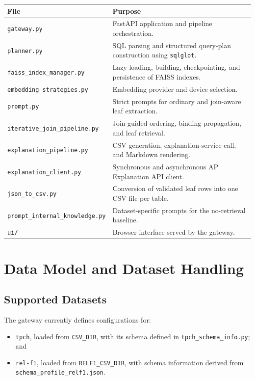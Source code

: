 \documentclass[11pt,a4paper]{article}
\newcommand{\code}[1]{\texttt{#1}}
\begin{document}
\begin{longtable}{>{\raggedright\arraybackslash}p{} >{\raggedright\arraybackslash}p{}}
\toprule
\textbf{File} & \textbf{Purpose} \\
\midrule
\endhead
\code{gateway.py} & FastAPI application and pipeline orchestration. \\
\code{planner.py} & SQL parsing and structured query-plan construction using \code{sqlglot}. \\
\code{faiss\_index\_manager.py} & Lazy loading, building, checkpointing, and persistence of FAISS indexes. \\
\code{embedding\_strategies.py} & Embedding provider and device selection. \\
\code{prompt.py} & Strict prompts for ordinary and join-aware leaf extraction. \\
\code{iterative\_join\_pipeline.py} & Join-guided ordering, binding propagation, and leaf retrieval. \\
\code{explanation\_pipeline.py} & CSV generation, explanation-service call, and Markdown rendering. \\
\code{explanation\_client.py} & Synchronous and asynchronous AP Explanation API client. \\
\code{json\_to\_csv.py} & Conversion of validated leaf rows into one CSV file per table. \\
\code{prompt\_internal\_knowledge.py} & Dataset-specific prompts for the no-retrieval baseline. \\
\code{ui/} & Browser interface served by the gateway. \\
\bottomrule
\end{longtable}

\section{Data Model and Dataset Handling}

\subsection{Supported Datasets}

The gateway currently defines configurations for:

\begin{itemize}
  \item \code{tpch}, loaded from \code{CSV\_DIR}, with its schema defined in
        \code{tpch\_schema\_info.py}; and
  \item \code{rel-f1}, loaded from \code{RELF1\_CSV\_DIR}, with schema information
        derived from \code{schema\_profile\_relf1.json}.
\end{itemize}
\end{document}
